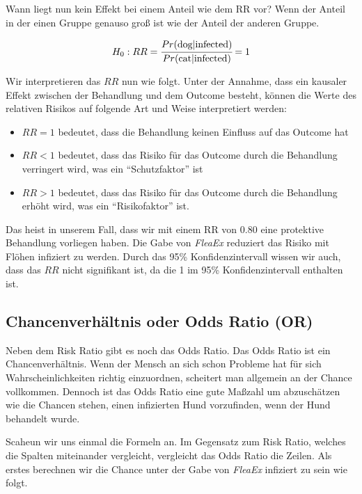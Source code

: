 \documentclass[
  letterpaper,
]{scrbook}
\providecommand{\tightlist}{%
  \setlength{\itemsep}{0pt}\setlength{\parskip}{0pt}}\usepackage{longtable,booktabs,array}
\begin{document}
Wann liegt nun kein Effekt bei einem Anteil wie dem RR vor? Wenn der
Anteil in der einen Gruppe genauso groß ist wie der Anteil der anderen
Gruppe.

\[
H_0: RR = \cfrac{Pr(\mbox{dog}|\mbox{infected})}{Pr(\mbox{cat}|\mbox{infected})} = 1
\]

Wir interpretieren das \(RR\) nun wie folgt. Unter der Annahme, dass ein
kausaler Effekt zwischen der Behandlung und dem Outcome besteht, können
die Werte des relativen Risikos auf folgende Art und Weise interpretiert
werden:

\begin{itemize}
\tightlist
\item
  \(RR = 1\) bedeutet, dass die Behandlung keinen Einfluss auf das
  Outcome hat
\item
  \(RR < 1\) bedeutet, dass das Risiko für das Outcome durch die
  Behandlung verringert wird, was ein ``Schutzfaktor'' ist
\item
  \(RR > 1\) bedeutet, dass das Risiko für das Outcome durch die
  Behandlung erhöht wird, was ein ``Risikofaktor'' ist.
\end{itemize}

Das heist in unserem Fall, dass wir mit einem RR von \(0.80\) eine
protektive Behandlung vorliegen haben. Die Gabe von \emph{FleaEx}
reduziert das Risiko mit Flöhen infiziert zu werden. Durch das 95\%
Konfidenzintervall wissen wir auch, dass das \(RR\) nicht signifikant
ist, da die 1 im 95\% Konfidenzintervall enthalten ist.

\hypertarget{chancenverhuxe4ltnis-oder-odds-ratio-or}{%
\subsection{Chancenverhältnis oder Odds Ratio
(OR)}\label{chancenverhuxe4ltnis-oder-odds-ratio-or}}

Neben dem Risk Ratio gibt es noch das Odds Ratio. Das Odds Ratio ist ein
Chancenverhältnis. Wenn der Mensch an sich schon Probleme hat für sich
Wahrscheinlichkeiten richtig einzuordnen, scheitert man allgemein an der
Chance vollkommen. Dennoch ist das Odds Ratio eine gute Maßzahl um
abzuschätzen wie die Chancen stehen, einen infizierten Hund vorzufinden,
wenn der Hund behandelt wurde.

Scaheun wir uns einmal die Formeln an. Im Gegensatz zum Risk Ratio,
welches die Spalten miteinander vergleicht, vergleicht das Odds Ratio
die Zeilen. Als erstes berechnen wir die Chance unter der Gabe von
\emph{FleaEx} infiziert zu sein wie folgt.
\end{document}
